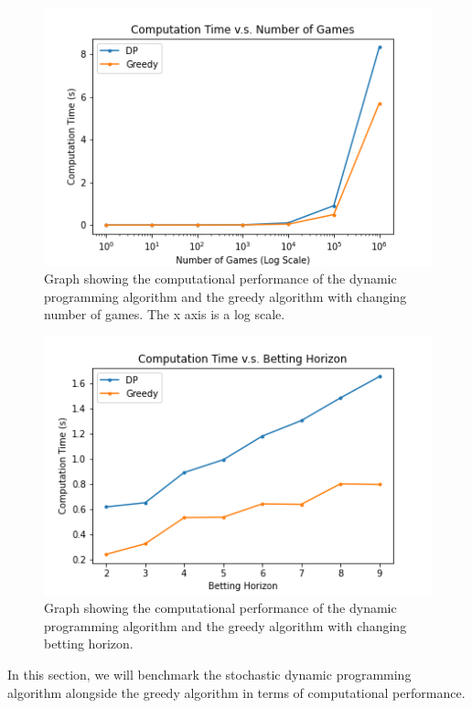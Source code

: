 \documentclass[conference]{IEEEtran}
\begin{document}
\begin{figure}[htbp]
\includegraphics[width=\columnwidth]{dp-vs-greedy-computation-time-log.png}
\caption{Graph showing the computational performance of the dynamic programming algorithm and the greedy algorithm with changing number of games. The x axis is a log scale.}
\label{dp-vs-greedy-computation-time-log}
\end{figure}

\begin{figure}[htbp]
\includegraphics[width=\columnwidth]{dp-vs-greedy-computation-time-vs-betting-horizon.png}
\caption{Graph showing the computational performance of the dynamic programming algorithm and the greedy algorithm with changing betting horizon.}
\label{dp-vs-greedy-computation-time-vs-betting-horizon}
\end{figure}

In this section, we will benchmark the stochastic dynamic programming algorithm alongside the greedy algorithm in terms of computational performance.
\end{document}
